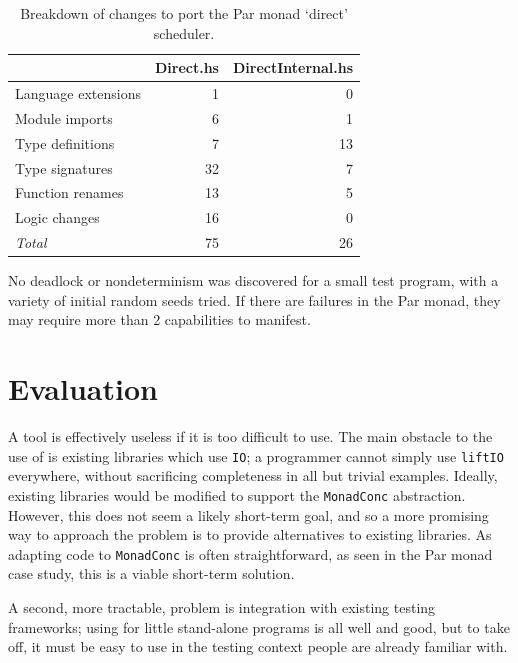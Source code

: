 \begin{table}
  \centering
  \begin{tabular}{lrr} \toprule
    & Direct.hs & DirectInternal.hs \\ \midrule
    Language extensions & 1 & 0 \\
    Module imports & 6 & 1 \\
    Type definitions & 7 & 13 \\
    Type signatures & 32 & 7 \\
    Function renames & 13 & 5 \\
    Logic changes & 16 & 0 \\ \midrule
    \emph{Total} & 75 & 26 \\ \bottomrule
  \end{tabular}
  \caption{Breakdown of changes to port the Par monad `direct' scheduler.}\label{tbl:example-parmonad-diff}
\end{table}

No deadlock or nondeterminism was discovered for a small test program,
with a variety of initial random seeds tried.  If there are failures
in the Par monad, they may require more than 2 capabilities to
manifest.

\section{Evaluation}
\label{sec:dejafu-evaluation}

A tool is effectively useless if it is too difficult to use.  The main
obstacle to the use of \dejafu{} is existing libraries which use
\verb|IO|; a programmer cannot simply use \verb|liftIO| everywhere,
without sacrificing completeness in all but trivial examples.
Ideally, existing libraries would be modified to support the
\verb|MonadConc| abstraction.  However, this does not seem a likely
short-term goal, and so a more promising way to approach the problem
is to provide alternatives to existing libraries.  As adapting code to
\verb|MonadConc| is often straightforward, as seen in the Par monad
case study, this is a viable short-term solution.

A second, more tractable, problem is integration with existing testing
frameworks; using \dejafu{} for little stand-alone programs is all
well and good, but to take off, it must be easy to use in the testing
context people are already familiar with.

